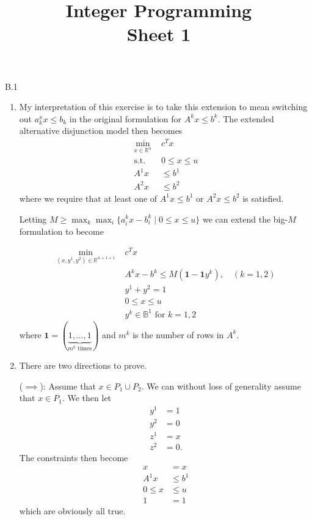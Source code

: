 \documentclass[a4paper]{article}
\title{Integer Programming \\ Sheet 1}
\begin{document}
  \maketitle
  \begin{exercise}{B.1}
    \begin{enumerate}[label=(\roman*)]
      \item My interpretation of this exercise is to take this extension to mean switching out $ a_k^{x}x \leq b_k $ in the original formulation for $ A^{k}x \leq b^{k} $. The extended alternative disjunction model then becomes
        \begin{align*}
          \min_{x \in \mathbb{R}^{n}}\,\, &c^{T} x \\
          \text{s.t. } & 0\leq x \leq u \\
          A^{1}x &\leq b^{1} \\
          A^{2}x &\leq b^{2}
        \end{align*}
        where we require that at least one of $ A^{1}x \leq b^{1} $ or $ A^{2}x \leq b^{2} $ is satisfied.

        Letting $ M \geq \max_k \max_i \{a^{k}_ix - b_i^{k} \mid 0 \leq x \leq u\} $ we can extend the big-$ M $ formulation to become

        \begin{align*}
          \min_{(x,y^{1},y^{2})\in \mathbb{R}^{n + 1 + 1}}\,
          \, &c^{T}x \\
             &A^{k}x - b^{k} \leq M(\mathbf{1} - \mathbf{1}y^{k}),\quad (k = 1,2) \\
             & y^{1} + y^{2} = 1 \\
             & 0 \leq x \leq u \\
             & y^{k} \in \mathbb{B}^{1} \text{ for } k = 1,2
        \end{align*}
        where $ \mathbf{1} = (\underbrace{1, \ldots, 1}_{m^{k} \text{ times}}) $ and $ m^{k} $ is the number of rows in $ A^{k} $.

      \item There are two directions to prove.

        ($ \implies $): Assume that $ x \in P_{1} \cup P_{2} $. We can without loss of generality assume that $ x \in P_{1} $. We then let
        \begin{align*}
          y^{1} &= 1 \\
          y^{2} &= 0 \\
          z^{1} &= x \\
          z^{2} &= 0
        .\end{align*}
        The constraints then become
        \begin{align*}
          x &= x \\
          A^{1}x &\leq b^{1} \\
          0 \leq x &\leq u \\
          1 &= 1
        \end{align*}
        which are obviously all true.


\end{enumerate}
\end{exercise}
\end{document}
